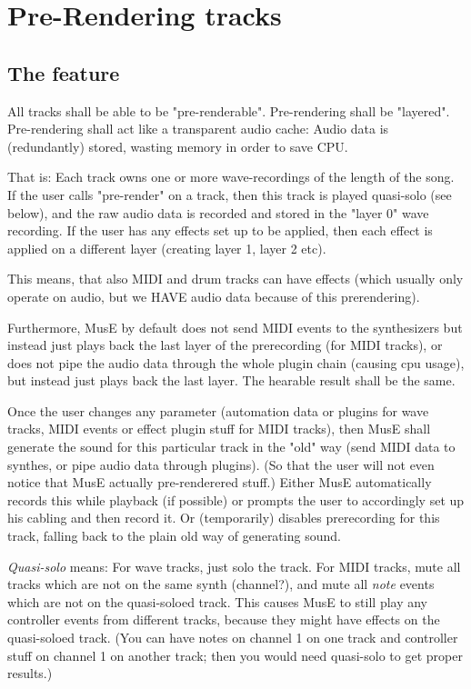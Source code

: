 \documentclass[a4paper]{report}
\begin{document}
\section{Pre-Rendering tracks}
\subsection{The feature}
All tracks shall be able to be "pre-renderable". Pre-rendering shall
be "layered". Pre-rendering shall act like a transparent audio cache:
Audio data is (redundantly) stored, wasting memory in order to save CPU.

That is: Each track owns one or more wave-recordings of the length of
the song. If the user calls "pre-render" on a track, then this track
is played quasi-solo (see below), and the raw audio data is recorded
and stored in the "layer 0" wave recording. If the user has any effects
set up to be applied, then each effect is applied on a different layer
(creating layer 1, layer 2 etc).

This means, that also MIDI and drum tracks can have effects (which
usually only operate on audio, but we HAVE audio data because of this
prerendering).

Furthermore, MusE by default does not send MIDI events to the synthesizers
but instead just plays back the last layer of the prerecording (for
MIDI tracks), or does not pipe the audio data through the whole plugin
chain (causing cpu usage), but instead just plays back the last layer.
The hearable result shall be the same.

Once the user changes any parameter (automation data or plugins for
wave tracks, MIDI events or effect plugin stuff for MIDI tracks),
then MusE shall generate the sound for this particular track in the
"old" way (send MIDI data to synthes, or pipe audio data through plugins). 
(So that the user will not even notice that MusE actually pre-renderered
stuff.) Either MusE automatically records this while playback (if possible)
or prompts the user to accordingly set up his cabling and then record
it. Or (temporarily) disables prerecording for this track, falling back
to the plain old way of generating sound.

\emph{Quasi-solo} means: For wave tracks, just solo the track. For MIDI
tracks, mute all tracks which are not on the same synth (channel?),
and mute all \emph{note} events which are not on the quasi-soloed track.
This causes MusE to still play any controller events from different
tracks, because they might have effects on the quasi-soloed track. (You
can have notes on channel 1 on one track and controller stuff on channel
1 on another track; then you would need quasi-solo to get proper results.)
\end{document}
